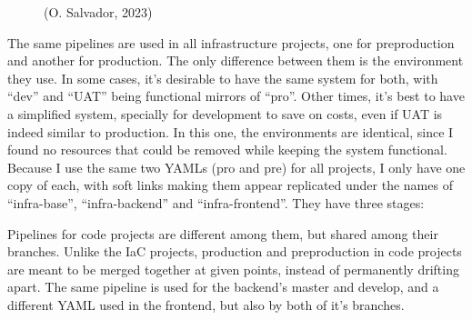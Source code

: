 \documentclass[11pt]{article}
\begin{document}
\begin{flushleft}
    \begin{figure}[htb]
        \centering
        \caption{ (O. Salvador, 2023)}
    \end{figure}

The same pipelines are used in all infrastructure projects, one for preproduction and another for production. The only difference between them is the environment they use. In some cases, it's desirable to have the same system for both, with ``dev'' and ``UAT'' being functional mirrors of ``pro''. Other times, it's best to have a simplified system, specially for development to save on costs, even if UAT is indeed similar to production. In this one, the environments are identical, since I found no resources that could be removed while keeping the system functional. Because I use the same two YAMLs (pro and pre) for all projects, I only have one copy of each, with soft links making them appear replicated under the names of ``infra-base'', ``infra-backend'' and ``infra-frontend''. They have three stages:
\linebreak

Pipelines for code projects are different among them, but shared among their branches. Unlike the IaC projects, production and preproduction in code projects are meant to be merged together at given points, instead of permanently drifting apart. The same pipeline is used for the backend's master and develop, and a different YAML used in the frontend, but also by both of it's branches.
\linebreak


\end{flushleft}
\end{document}
